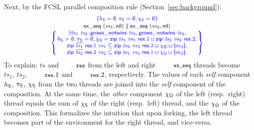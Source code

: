 Next, by the FCSL parallel composition rule
(Section~\ref{sec:background}):
%
\[
{\small{
\begin{array}{c}
\specK{\{\heaps = \emptyset, \perms = \emptyset, \hists = \emptyset\}}\\[2pt]
\mathsf{ex\_seq}~(\vvs_1, \mathsf{nil}) %
\parallel
\mathsf{ex\_seq}~(\vvs_2, \mathsf{nil}) \\[1pt]
\spec{\!\!\!
\begin{array}{c}
\exists \ts_1~\ts_2\ldot \mathsf{grows\_notwins}~{\ts_1}, \mathsf{grows\_notwins}~{\ts_2},\\
 \heaps = \emptyset, \perms = \emptyset, \hists = \mathsf{zip}~\ts_1~\vvs_1~\res.1 \hunion \mathsf{zip}~\ts_2~\vvs_2~\res.2,\\
 \mathsf{zip}~\overline{\ts_1}~\res.1~\vvs_1 \subseteq \mathsf{zip}~\ts_2~\vvs_2~\res.2 \hunion \histo \hunion\mygather{\pending}, \\%
 \mathsf{zip}~\overline{\ts_2}~\res.2~\vvs_2 \subseteq \mathsf{zip}~\ts_1~\vvs_1~\res.1 \hunion \histo \hunion\mygather{\pending}. %
\end{array}
\!\!\!}
\end{array}
}}
\]
%
%
To explain: $ts$ and $\esc{res}$ from the left and right
$\esc{ex\_seq}$ threads become $ts_1$, $ts_2$, $\esc{res}.1$ and
$\esc{res}.2$, respectively. The values of each \emph{self} component
$h_{\mathsf{S}}$, $\pi_{\mathsf{S}}$, $\chi_{\mathsf{S}}$ from the two threads are joined into the
\emph{self} component of the composition. At the same time, the
\emph{other} component $\chi_{\mathsf{O}}$ of the left (resp.~right) thread
equals the sum of $\chi_{\mathsf{S}}$ of the right (resp.~left) thread, and the
$\chi_{\mathsf{O}}$ of the composition.  This formalizes the intuition that upon
forking, the left thread becomes part of the environment for the right
thread, and vice-versa.

